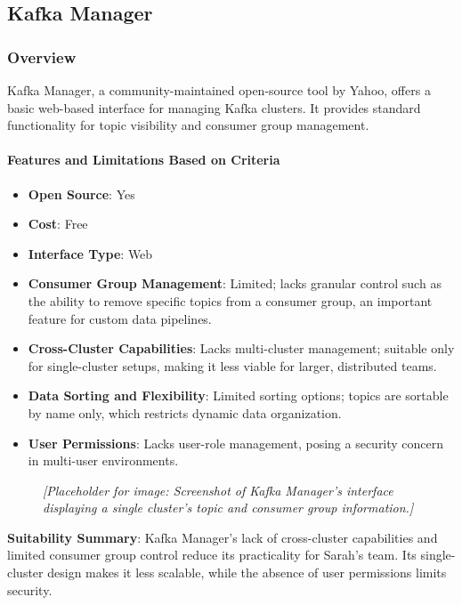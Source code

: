 \documentclass[10pt , a4paper]{report}
\begin{document}
\newpage

\subsection{Kafka Manager} 
\subsubsection*{Overview} 
Kafka Manager, a community-maintained open-source tool by Yahoo, offers a basic web-based interface for managing Kafka clusters. It provides standard functionality for topic visibility and consumer group management.

\paragraph{Features and Limitations Based on Criteria}
\begin{itemize} 
    \item \small \textbf{Open Source}: Yes
    \item \small \textbf{Cost}: Free 
    \item \small \textbf{Interface Type}: Web 
    \item \small \textbf{Consumer Group Management}: Limited; lacks granular control such as the ability to remove specific topics from a consumer group, an important feature for custom data pipelines.
    \item \small \textbf{Cross-Cluster Capabilities}: Lacks multi-cluster management; suitable only for single-cluster setups, making it less viable for larger, distributed teams.
    \item \small \textbf{Data Sorting and Flexibility}: Limited sorting options; topics are sortable by name only, which restricts dynamic data organization.
    \item \small \textbf{User Permissions}: Lacks user-role management, posing a security concern in multi-user environments.
\end{itemize}

\begin{figure}[h] 
\centering 
\textit{[Placeholder for image: Screenshot of Kafka Manager’s interface displaying a single cluster’s topic and consumer group information.]} 
\end{figure}

\textbf{Suitability Summary}: Kafka Manager’s lack of cross-cluster capabilities and limited consumer group control reduce its practicality for Sarah’s team. Its single-cluster design makes it less scalable, while the absence of user permissions limits security.
\end{document}
